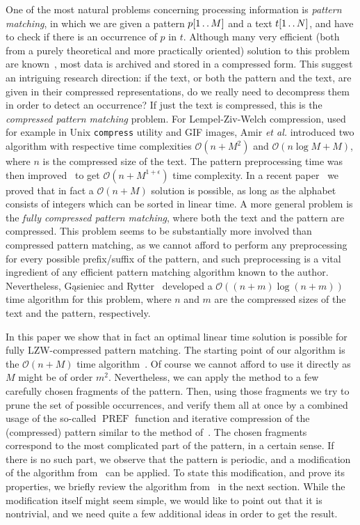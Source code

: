 \documentclass[runningheads]{llncs}
\newcommand{\twodots}{\mathinner{\ldotp\ldotp}}
\DeclareMathOperator{\PREF}{PREF}
\begin{document}
One of the most natural problems concerning processing information is {\it pattern matching}, in which we are given a pattern $p[1\twodots M]$ and a text $t[1\twodots N]$, and have to check if there is an occurrence of $p$ in $t$. Although many very efficient (both from a purely theoretical and more practically oriented) solution to this problem are known~\cite{MP,RealGalil,KMP,ConstGalil,Breslauer,BM}, most data is archived and stored in a compressed form. This suggest an intriguing research direction: if the text, or both the pattern and the text, are given in their compressed representations, do we really need to decompress them in order to detect an occurrence? If just the text is compressed, this is the {\it compressed pattern matching} problem. For Lempel-Ziv-Welch compression, used for example in Unix \texttt{compress} utility and GIF images, Amir {\it et al.} introduced two algorithm with respective time complexities $\mathcal{O}(n+M^2)$ and $\mathcal{O}(n\log M+M)$, where $n$ is the compressed size of the text. The pattern preprocessing time was then improved~\cite{Kosaraju} to get $\mathcal{O}(n+M^{1+\epsilon})$ time complexity. In a recent paper~\cite{GawrychowskiLZW} we proved that in fact a $\mathcal{O}(n+M)$ solution is possible, as long as the alphabet consists of integers which can be sorted in linear time. A more general problem is the {\it fully compressed pattern matching}, where both the text and the pattern are compressed.
This problem seems to be substantially more involved than compressed pattern matching, as we cannot afford to perform any preprocessing for every possible prefix/suffix of the pattern, and such preprocessing is a vital ingredient of any efficient pattern matching algorithm known to the author.
Nevertheless, G\k{a}sieniec and Rytter~\cite{RytterGasieniec} developed a $\mathcal{O}((n+m)\log(n+m))$ time algorithm for this problem, where $n$ and $m$ are the compressed sizes of the text and the pattern, respectively. 

In this paper we show that in fact an optimal linear time solution is possible for fully LZW-compressed pattern matching. The starting point of our algorithm is the $\mathcal{O}(n+M)$ time algorithm~\cite{GawrychowskiLZW}. Of course we cannot afford to use it directly as $M$ might be of order $m^2$. Nevertheless, we can apply the method to a few carefully chosen fragments of the pattern. Then, using those fragments we try to prune the set of possible occurrences, and verify them all at once by a combined usage of the so-called $\PREF$ function and iterative compression of the (compressed) pattern similar to the method of~\cite{RytterGasieniec}. The chosen fragments correspond to the most complicated part of the pattern, in a certain sense. If there is no such part, we observe that the pattern is periodic, and a modification of the algorithm from~\cite{GawrychowskiLZW} can be applied. To state this modification, and prove its properties, we briefly review the algorithm from~\cite{GawrychowskiLZW} in the next section. While the modification itself might seem simple, we would like to point out that it is nontrivial, and we need quite a few additional ideas in order to get the result.
\end{document}
